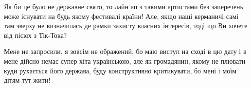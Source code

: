 Як би це було не державне свято, то лайн ап з такими артистами без заперечень
може існувати на будь якому фестивалі країни! Але, якщо наші керманичі самі там
зверху не визначилась де рамки захисту власних інтересів, тоді що Ви хочете від
пісюх з Тік-Тока?

Мене не запросили, я зовсім не ображений, бо маю виступ на сході в цю дату і в
мене дійсно немає супер-хіта українською, але як громадянин, якому не плювати
куди рухається його держава, буду конструктивно критикувати, бо мені і моїм
дітям тут жити!

